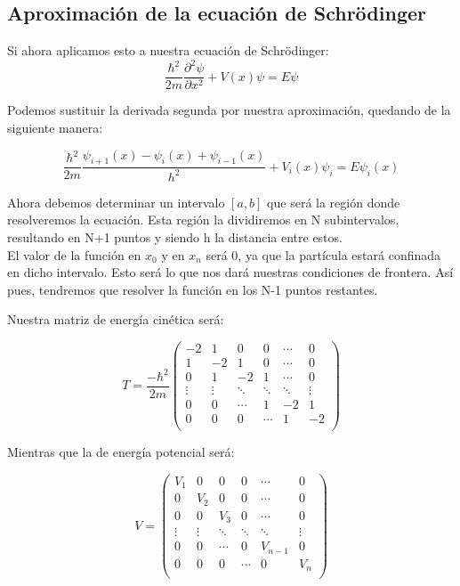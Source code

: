 \documentclass{article}
\begin{document}
	\subsection{Aproximación de la ecuación de Schrödinger}
Si ahora aplicamos esto a nuestra ecuación de Schrödinger:
\begin{equation*}
	\frac{\hbar^2}{2m} \frac{\partial^2\psi}{\partial x^2} + V(x)\psi = E \psi
\end{equation*}

Podemos sustituir la derivada segunda por nuestra aproximación, quedando de la siguiente manera:

\begin{equation}
	\frac{\hbar^2}{2m} \frac{\psi_{i+1}(x)-\psi_i(x)+\psi_{i-1}(x)}{h^2} + V_i(x)\psi_i = E \psi_i(x)
\end{equation}

Ahora debemos determinar un intervalo $[a,b]$ que será la región donde resolveremos 
la ecuación. Esta región la dividiremos en N subintervalos, resultando en N+1 puntos y siendo h la distancia entre estos.\\

El valor de la función en $x_0$ y en $x_n$ será 0, ya que la partícula estará confinada en dicho intervalo. Esto será lo que nos dará nuestras condiciones de frontera. Así pues, tendremos que resolver la función en los N-1 puntos restantes.

Nuestra matriz de energía cinética será:

\begin{equation}
	T=\frac{-\hbar^2}{2m} \left(
	\begin{matrix}
		-2 & 1 & 0 & 0 &  \cdots & 0 \\
		1 & -2 & 1 & 0 & \cdots & 0\\
		0 & 1 & -2 & 1 & \cdots & 0\\
		\vdots & \vdots&\ddots &\ddots &\ddots& \vdots \\
		0 & 0   &\cdots &1& -2 & 1 \\
		0 & 0 & 0  &\cdots & 1 & -2 \\
	\end{matrix}
	\right)
\end{equation}

Mientras que la de energía potencial será:

\begin{equation}
	V= \left(
	\begin{matrix}
		V_1 & 0 & 0 & 0 &  \cdots & 0 \\
		0 & V_2 & 0 & 0 & \cdots & 0\\
		0 & 0 & V_3 & 0 & \cdots & 0\\
		\vdots & \vdots&\ddots &\ddots &\ddots& \vdots \\
		0 & 0   &\cdots &0& V_{n-1} & 0 \\
		0 & 0 & 0  &\cdots & 0 & V_{n} \\
	\end{matrix}
	\right)
\end{equation}
\end{document}

